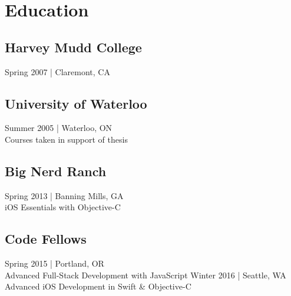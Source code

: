 \documentclass[]{jhearn-resume}
\begin{document}
\begin{minipage}[t]{0.34\textwidth} 

\vspace{25pt}
\section{Education} 

\subsection{Harvey Mudd College}
{\footnotesize Spring 2007 | Claremont, CA}
\sectionsep

\subsection{University of Waterloo}
{\small Summer 2005 | Waterloo, ON}\\
{\footnotesize Courses taken in support of thesis}
\sectionsep

\subsection{Big Nerd Ranch}
{\small Spring 2013 | Banning Mills, GA}\\
{\footnotesize iOS Essentials with Objective-C}
\sectionsep

\subsection{Code Fellows}
{\small Spring 2015 | Portland, OR}\\
{\footnotesize Advanced Full-Stack Development with JavaScript}
%
{\small Winter 2016 | Seattle, WA}\\
{\footnotesize Advanced iOS Development in Swift \& Objective-C}
\sectionsep
\vspace{-\topsep}


\end{minipage}
\end{document}
